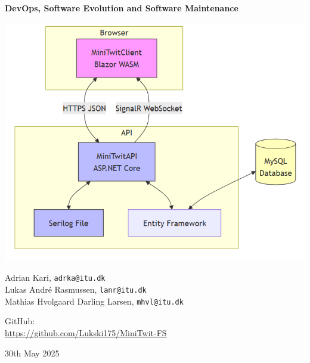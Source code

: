 \documentclass{article}
\begin{document}
\begin{titlepage}
  \centering
  {\LARGE\bfseries DevOps, Software Evolution and Software Maintenance\par}
  \vspace{1.5cm}
  \includegraphics[width=1\textwidth]{images/Architecture.png}\par
  \vspace{1cm}
  {\large
    Adrian Kari, \texttt{adrka@itu.dk}\\[0.5ex]
    Lukas André Rasmussen, \texttt{lanr@itu.dk}\\[0.5ex]
    Mathias Hvolgaard Darling Larsen, \texttt{mhvl@itu.dk}
  \par}
  \vfill

  GitHub:\\
  \url{https://github.com/Lukski175/MiniTwit-FS}

  \vspace{1cm}
  {\large 30th May 2025\par}
\end{titlepage}


\tableofcontents





\printbibliography
\end{document}
